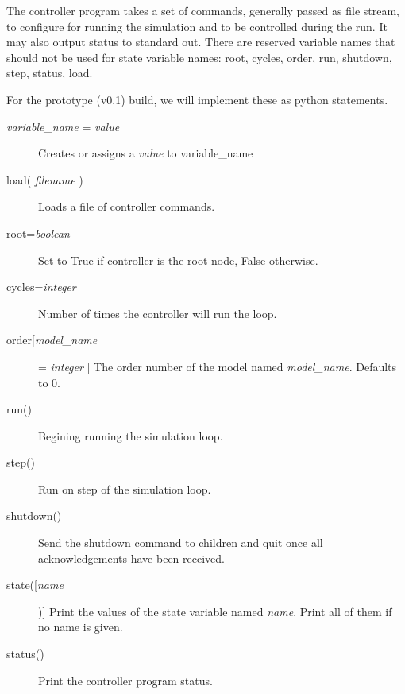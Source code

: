 \documentclass{book}
\begin{document}
The controller program takes a set of commands, generally passed as file stream, to configure for running the simulation and to be controlled during the run. It may also output status to standard out. There are reserved variable names that should not be used for state variable names: root, cycles, order, run, shutdown, step, status, load.

For the prototype (v0.1) build, we will implement these as python statements.

\begin{description}
	\item[\emph{variable\_name} = \emph{value}] Creates or assigns a \emph{value} to {variable\_name}
	\item[load( \emph{filename} )] Loads a file of controller commands.
	\item[root=\emph{boolean}] Set to True if controller is the root node, False otherwise.
	\item[cycles=\emph{integer}] Number of times the controller will run the loop.
	\item[order[\emph{model\_name}] = \emph{integer} ] The order number of the model named \emph{model\_name}. Defaults to 0.
	\item[run()] Begining running the simulation loop.
	\item[step()] Run on step of the simulation loop.
	\item[shutdown()] Send the shutdown command to children and quit once all acknowledgements have been received.
	\item[state([\emph{name}])] Print the values of the state variable named \emph{name}. Print all of them if no name is given.
	\item[status()] Print the controller program status.
\end{description}
\end{document}

